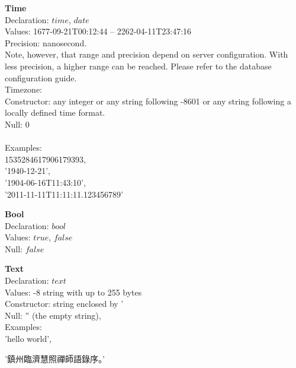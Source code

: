 \begin{minipage}{\textwidth}
\textbf{Time} \\
Declaration: $time$, $date$ \\
Values:   1677-09-21T00:12:44 --
          2262-04-11T23:47:16 \\
Precision: nanosecond. \\
Note, however, that range and precision depend on server configuration.
With less precision, a higher range can be reached.
Please refer to the database configuration guide. \\
Timezone:  \\
Constructor: any integer or any string following -8601 
or any string following a locally defined time format. \\
Null: $0$ \\
 \\
Examples:\\
1535284617906179393, \\
'1940-12-21', \\
'1904-06-16T11:43:10', \\
'2011-11-11T11:11:11.123456789'
\end{minipage}

\begin{minipage}{\textwidth}
\textbf{Bool} \\
Declaration: $bool$ \\
Values: $true$, $false$ \\
Null: $false$
\end{minipage}

\begin{minipage}{\textwidth}
\textbf{Text} \\
Declaration: $text$ \\
Values: -8 string with up to 255 bytes\\
Constructor: string enclosed by ' \\
Null: '' (the empty string),\\
Examples:\\
'hello world',\\
\begin{CJK}{UTF8}{gbsn}
'鎮州臨濟慧照禪師語錄序。' 
\end{CJK} \\
\end{minipage}

